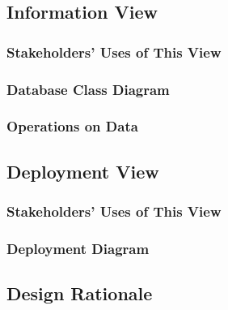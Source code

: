\subsection{Information View}

\subsubsection{Stakeholders' Uses of This View}

\subsubsection{Database Class Diagram}

\subsubsection{Operations on Data}

\subsection{Deployment View}

\subsubsection{Stakeholders' Uses of This View}

\subsubsection{Deployment Diagram}

\subsection{Design Rationale}
